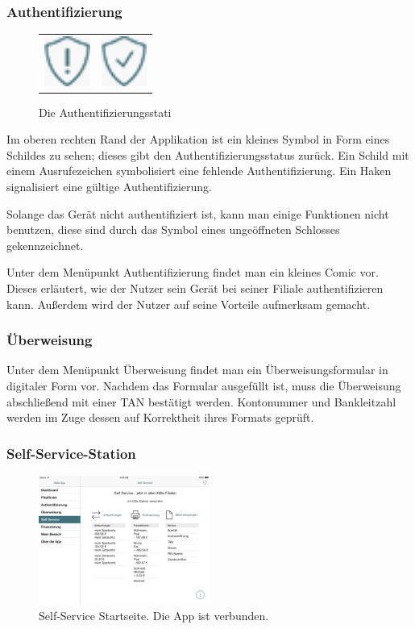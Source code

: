 \subsubsection{Authentifizierung}
\begin{figure}[h]
    \centering
	\begin{tabular}{@{}cc@{}}
        	\includegraphics[width=1.5cm]{Pictures/notauth} &
    		\includegraphics[width=1.5cm]{Pictures/authed}
    \end{tabular}
	\caption{Die Authentifizierungsstati\label{fig4}}
\end{figure}
\pagebreak
\noindent	Im oberen rechten Rand der Applikation ist ein kleines Symbol in Form eines Schildes zu sehen; dieses gibt den Authentifizierungsstatus zurück. Ein Schild mit einem Ausrufezeichen symbolisiert eine fehlende Authentifizierung. Ein Haken signalisiert eine gültige Authentifizierung.

	Solange das Gerät nicht authentifiziert ist, kann man einige Funktionen nicht benutzen, diese sind durch das Symbol eines ungeöffneten Schlosses gekennzeichnet.

	Unter dem Menüpunkt Authentifizierung findet man ein kleines Comic vor. Dieses erläutert, wie der Nutzer sein Gerät bei seiner Filiale authentifizieren kann. Außerdem wird der Nutzer auf seine Vorteile aufmerksam gemacht.

\subsubsection{Überweisung}
	Unter dem Menüpunkt Überweisung findet man ein Überweisungsformular in digitaler Form vor. Nachdem das Formular ausgefüllt ist, muss die Überweisung abschließend mit einer TAN bestätigt werden. Kontonummer und Bankleitzahl werden im Zuge dessen auf Korrektheit ihres Formats geprüft.

\subsubsection{Self-Service-Station}
\begin{figure}[h]
	\centering
  \includegraphics[width=0.5\textwidth]{Pictures/SSverbunden}
	\caption{Self-Service Startseite. Die App ist verbunden.}
	\label{fig5}
\end{figure}

